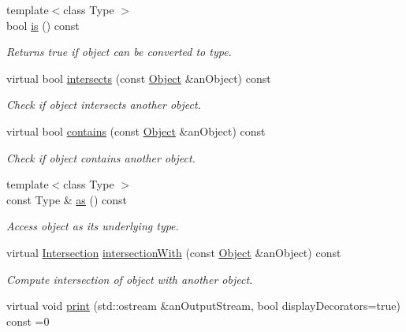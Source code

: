 \begin{DoxyCompactItemize}
{\footnotesize template$<$class Type $>$ }\\bool \hyperlink{classlibrary_1_1math_1_1geom_1_1d3_1_1_object_a72d75450e5158f602f0847f082606603}{is} () const
\begin{DoxyCompactList}\small\item\em Returns true if object can be converted to type. \end{DoxyCompactList}\item 
virtual bool \hyperlink{classlibrary_1_1math_1_1geom_1_1d3_1_1_object_a98c37b46f2fdc5f22bc123a757dcf73e}{intersects} (const \hyperlink{classlibrary_1_1math_1_1geom_1_1d3_1_1_object}{Object} \&an\+Object) const
\begin{DoxyCompactList}\small\item\em Check if object intersects another object. \end{DoxyCompactList}\item 
virtual bool \hyperlink{classlibrary_1_1math_1_1geom_1_1d3_1_1_object_abaf45bf02ca165ba7bf685b24f5f97ef}{contains} (const \hyperlink{classlibrary_1_1math_1_1geom_1_1d3_1_1_object}{Object} \&an\+Object) const
\begin{DoxyCompactList}\small\item\em Check if object contains another object. \end{DoxyCompactList}\item 
{\footnotesize template$<$class Type $>$ }\\const Type \& \hyperlink{classlibrary_1_1math_1_1geom_1_1d3_1_1_object_a0428ee9010710f5ec7d055a86cc586f8}{as} () const
\begin{DoxyCompactList}\small\item\em Access object as its underlying type. \end{DoxyCompactList}\item 
virtual \hyperlink{classlibrary_1_1math_1_1geom_1_1d3_1_1_intersection}{Intersection} \hyperlink{classlibrary_1_1math_1_1geom_1_1d3_1_1_object_a609b1ea1d5f868b004726622efabad5d}{intersection\+With} (const \hyperlink{classlibrary_1_1math_1_1geom_1_1d3_1_1_object}{Object} \&an\+Object) const
\begin{DoxyCompactList}\small\item\em Compute intersection of object with another object. \end{DoxyCompactList}\item 
virtual void \hyperlink{classlibrary_1_1math_1_1geom_1_1d3_1_1_object_aa166f4ce4d116a248f0fc861c75012ca}{print} (std\+::ostream \&an\+Output\+Stream, bool display\+Decorators=true) const =0

\end{DoxyCompactItemize}
